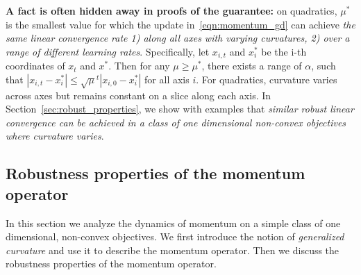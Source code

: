 \documentclass{article} %
\newcommand{\forjian}[1]{{\color{magenta}FOR JIAN: #1}}
\begin{document}
{\bf A fact is often hidden away in proofs of the guarantee:} 
on quadratics,
$\mu^*$ is the smallest value for which the update in~\eqref{eqn:momentum_gd} can achieve \emph{the same linear convergence rate 1) along all axes with varying curvatures, 2) over a range of different learning rates}. Specifically, let $x_{i, t}$ and $x_i^*$ be the i-th coordinates of $x_t$ and $x^*\!$.
Then {for any $\mu\!\geq\!\mu^*\!$}, there exists {a range of $\alpha$}, such that $| x_{i, t} - x_i^* | \leq\sqrt{\mu}^t | x_{i,0} - x_i^* |$ for all axis $i$. For quadratics, curvature varies across axes but remains constant on a slice along each axis. In Section~\ref{sec:robust_properties}, we show with examples that \emph{similar robust linear convergence can be achieved in a class of one dimensional non-convex objectives where curvature varies}.



\subsection{Robustness properties of the momentum operator}
\vspace{-0.2em}
\label{sec:robust_properties}
In this section we analyze the dynamics of momentum on a simple class of one dimensional, non-convex objectives.
We first introduce the notion of {\em generalized curvature} and use it to describe the momentum operator.
Then we discuss the robustness properties of the momentum operator. 
\end{document}
